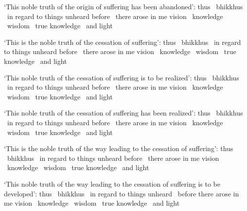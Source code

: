 \begin{english-only-hang}
  `This noble truth of the origin of suffering has been abandoned': thus \breathmark\ bhikkhus \breathmark\ in regard to things unheard before \breathmark\ there arose in me vision \breathmark\ knowledge \breathmark\ wisdom \breathmark\ true knowledge \breathmark\ and light
\end{english-only-hang}

\begin{english-only-hang}
  `This is the noble truth of the cessation of suffering': thus \breathmark\ bhikkhus \breathmark\ in regard to things unheard before \breathmark\ there arose in me vision \breathmark\ knowledge \breathmark\ wisdom \breathmark\ true knowledge \breathmark\ and light
\end{english-only-hang}

\begin{english-only-hang}
  `This noble truth of the cessation of suffering is to be realized': thus \breathmark\ bhikkhus \breathmark\ in regard to things unheard before \breathmark\ there arose in me vision \breathmark\ knowledge \breathmark\ wisdom \breathmark\ true knowledge \breathmark\ and light
\end{english-only-hang}

\begin{english-only-hang}
  `This noble truth of the cessation of suffering has been realized': thus \breathmark\ bhikkhus \breathmark\ in regard to things unheard before \breathmark\ there arose in me vision \breathmark\ knowledge \breathmark\ wisdom \breathmark\ true knowledge \breathmark\ and light
\end{english-only-hang}

\begin{english-only-hang}
  `This is the noble truth of the way leading to the cessation of suffering': thus \breathmark\ bhikkhus \breathmark\ in regard to things unheard before \breathmark\ there arose in me vision \breathmark\ knowledge \breathmark\ wisdom \breathmark\ true knowledge \breathmark\ and light
\end{english-only-hang}

\begin{english-only-hang}
  `This noble truth of the way leading to the cessation of suffering is to be developed': thus \breathmark\ bhikkhus \breathmark\ in regard to things unheard \breathmark\ before there arose in me vision \breathmark\ knowledge \breathmark\ wisdom \breathmark\ true knowledge \breathmark\ and light
\end{english-only-hang}

